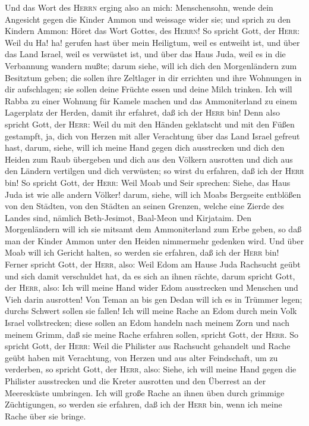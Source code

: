  Und das Wort des \textsc{Herrn} erging also an mich:
 Menschensohn, wende dein Angesicht gegen die Kinder Ammon
und weissage wider sie;  und sprich zu den Kindern Ammon:
Höret das Wort Gottes, des \textsc{Herrn}! So spricht Gott, der
\textsc{Herr}: Weil du Ha! ha! gerufen hast über mein Heiligtum, weil es
entweiht ist, und über das Land Israel, weil es verwüstet ist, und über
das Haus Juda, weil es in die Verbannung wandern mußte; 
darum siehe, will ich dich den Morgenländern zum Besitztum geben; die
sollen ihre Zeltlager in dir errichten und ihre Wohnungen in dir
aufschlagen; sie sollen deine Früchte essen und deine Milch trinken.
 Ich will Rabba zu einer Wohnung für Kamele machen und das
Ammoniterland zu einem Lagerplatz der Herden, damit ihr erfahret, daß
ich der \textsc{Herr} bin!  Denn also spricht Gott, der
\textsc{Herr}: Weil du mit den Händen geklatscht und mit den Füßen
gestampft, ja, dich von Herzen mit aller Verachtung über das Land Israel
gefreut hast, darum,  siehe, will ich meine Hand gegen
dich ausstrecken und dich den Heiden zum Raub übergeben und dich aus den
Völkern ausrotten und dich aus den Ländern vertilgen und dich verwüsten;
so wirst du erfahren, daß ich der \textsc{Herr} bin!  So
spricht Gott, der \textsc{Herr}: Weil Moab und Seir sprechen: Siehe, das
Haus Juda ist wie alle andern Völker!  darum, siehe, will
ich Moabs Bergseite entblößen von den Städten, von den Städten an seinen
Grenzen, welche eine Zierde des Landes sind, nämlich Beth-Jesimot,
Baal-Meon und Kirjataim.  Den Morgenländern will ich sie
mitsamt dem Ammoniterland zum Erbe geben, so daß man der Kinder Ammon
unter den Heiden nimmermehr gedenken wird.  Und über Moab
will ich Gericht halten, so werden sie erfahren, daß ich der
\textsc{Herr} bin!  Ferner spricht Gott, der
\textsc{Herr}, also: Weil Edom am Hause Juda Rachsucht geübt und sich
damit verschuldet hat, da es sich an ihnen rächte,  darum
spricht Gott, der \textsc{Herr}, also: Ich will meine Hand wider Edom
ausstrecken und Menschen und Vieh darin ausrotten! Von Teman an bis gen
Dedan will ich es in Trümmer legen; durchs Schwert sollen sie fallen!
 Ich will meine Rache an Edom durch mein Volk Israel
vollstrecken; diese sollen an Edom handeln nach meinem Zorn und nach
meinem Grimm, daß sie meine Rache erfahren sollen, spricht Gott, der
\textsc{Herr}.  So spricht Gott, der \textsc{Herr}: Weil
die Philister aus Rachsucht gehandelt und Rache geübt haben mit
Verachtung, von Herzen und aus alter Feindschaft, um zu verderben,
 so spricht Gott, der \textsc{Herr}, also: Siehe, ich
will meine Hand gegen die Philister ausstrecken und die Kreter ausrotten
und den Überrest an der Meeresküste umbringen.  Ich will
große Rache an ihnen üben durch grimmige Züchtigungen, so werden sie
erfahren, daß ich der \textsc{Herr} bin, wenn ich meine Rache über sie
bringe.

